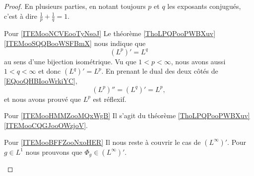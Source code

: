 \begin{proof}
    En plusieurs parties, en notant toujours \( p\) et \( q\) les exposants conjugués, c'est à dire \( \frac{1}{ p }+\frac{1}{ q }=1\).
    \begin{subproof}
        \item[Pour \ref{ITEMooNCVEooTyNsoJ}]
            Le théorème \ref{ThoLPQPooPWBXuv}\ref{ITEMooSQQBooWSFBmX} nous indique que
            \begin{equation}        \label{EQooQHBIooWrkiYC}
                (L^p)'=L^q
            \end{equation}
            au sens d'une bijection isométrique. Vu que \( 1<p<\infty\), nous avons aussi \( 1<q<\infty\) et donc \( (L^q)'=L^p\). En prenant le dual des deux côtés de \eqref{EQooQHBIooWrkiYC}, 
            \begin{equation}
                (L^p)''=(L^q)'=L^p,
            \end{equation}
            et nous avons prouvé que \( L^p\) est réflexif.
        \item[Pour \ref{ITEMooHMMZooMQxWgB}]
            Il s'agit du théorème \ref{ThoLPQPooPWBXuv}\ref{ITEMooCQGJooOWzjoV}.
        \item[Pour \ref{ITEMooBFFZooNxoHER}\cite{MonCerveau}]
            Il nous reste à couvrir le cas de \( (L^{\infty})'\). Pour \( g\in L^1\) nous prouvons que \( \Phi_g\in (L^{\infty})'\). 
            

\end{subproof}
\end{proof}
